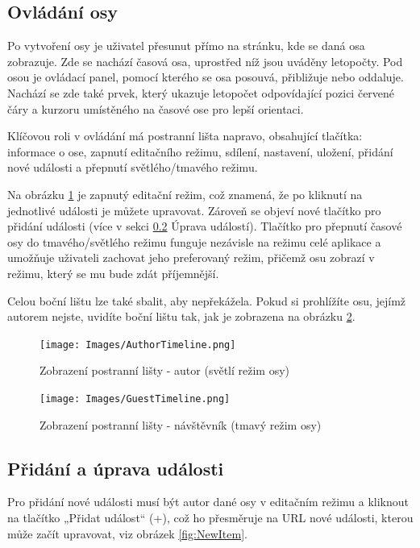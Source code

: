 \subsection{Ovládání osy}
Po vytvoření osy je uživatel přesunut přímo na stránku, kde se daná osa zobrazuje. Zde se nachází časová osa, uprostřed níž jsou uváděny letopočty. Pod osou je ovládací panel, pomocí kterého se osa posouvá, přibližuje nebo oddaluje. Nachází se zde také prvek, který ukazuje letopočet odpovídající pozici červené čáry a kurzoru umístěného na časové ose pro lepší orientaci. 

Klíčovou roli v ovládání má postranní lišta napravo, obsahující tlačítka: informace o ose, zapnutí editačního režimu, sdílení, nastavení, uložení, přidání nové události a přepnutí světlého/tmavého režimu.
\newpage

Na obrázku \ref{fig:AuthorTimeline} je zapnutý editační režim, což znamená, že po kliknutí na jednotlivé události je můžete upravovat. Zároveň se objeví nové tlačítko pro přidání události (více v sekci \ref{Úprava událostí} Úprava událostí). Tlačítko pro přepnutí časové osy do tmavého/světlého režimu funguje nezávisle na režimu celé aplikace a umožňuje uživateli zachovat jeho preferovaný režim, přičemž osu zobrazí v režimu, který se mu bude zdát příjemnější. 

Celou boční lištu lze také sbalit, aby nepřekážela. Pokud si prohlížíte osu, jejímž autorem nejste, uvidíte boční lištu tak, jak je zobrazena na obrázku \ref{fig:GuestTimeline}.


\begin{figure}[h]
    \centering
    \texttt{[image: Images/AuthorTimeline.png]}
    \caption{Zobrazení postranní lišty - autor (světlí režim osy)}
    \label{fig:AuthorTimeline}
\end{figure}

\begin{figure}[h]
    \centering
    \texttt{[image: Images/GuestTimeline.png]}
    \caption{Zobrazení postranní lišty - návštěvník (tmavý režim osy)}
    \label{fig:GuestTimeline}
\end{figure}

\newpage

\subsection{Přidání a úprava události}
\label{Úprava událostí}
Pro přidání nové události musí být autor dané osy v editačním režimu a kliknout na tlačítko „Přidat událost“ (+), což ho přesměruje na URL nové události, kterou může začít upravovat, viz obrázek \ref{fig:NewItem}. 

